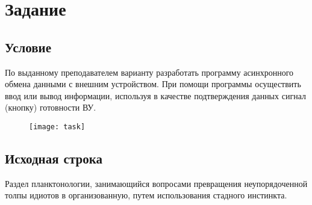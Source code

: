 
\tableofcontents

\newpage

\section{Задание}
\subsection{Условие}
По выданному преподавателем варианту разработать программу асинхронного обмена данными с внешним устройством. При помощи программы осуществить ввод или вывод информации, используя в качестве подтверждения данных сигнал (кнопку) готовности ВУ.

\begin{figure}[H]
\centering
\texttt{[image: task]}
\label{pic:task}
\end{figure}

\subsection{Исходная строка}
Раздел планктонологии, занимающийся вопросами превращения неупорядоченной толпы идиотов в организованную, путем использования стадного инстинкта.
